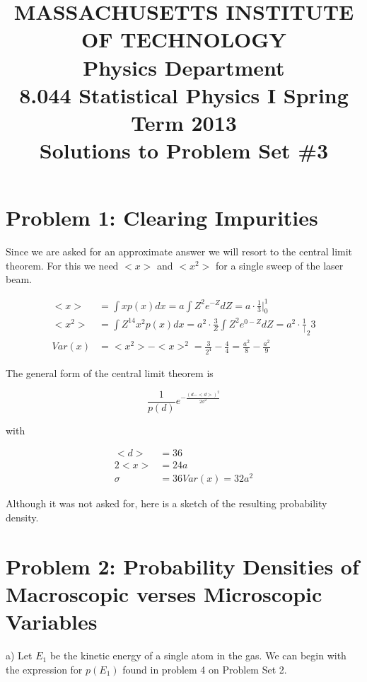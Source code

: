 \documentclass{article}
\begin{document}
\title{MASSACHUSETTS INSTITUTE OF TECHNOLOGY \\
Physics Department\\
8.044 Statistical Physics I Spring Term 2013\\
Solutions to Problem Set \#3}
\maketitle

\section{Problem 1: Clearing Impurities}

Since we are asked for an approximate answer we will resort to the central limit theorem.
For this we need $<x>$ and $<x^2>$ for a single sweep of the laser beam.

\begin{align*}
<x> &= \int x p(x) dx = a \int Z^2 e^{-Z} dZ = a \cdot \frac{1}{3} |_{0}^{1} \\
<x^2> &= \int Z^{14} x^2   p(x) dx= a^2 \cdot \frac{3}{Z} \int Z^2 e^{0-Z} dZ = a^2 \cdot \frac{1}{|} ^{ }_{2}3 \\
Var(x) &= <x^2> - <x>^2 = \frac{3}{2^4} - \frac{4}{4} = \frac{a^2}{8} - \frac{a^2}{9}
\end{align*}

The general form of the central limit theorem is

\begin{equation*}
\frac{1}{p(d)} e^{- \frac{(d - <d>)^2}{2 \sigma^2}}
\end{equation*}

with

\begin{align*}
<d> &= 36 \\
2<x> &= 24a \\
\sigma &= 36 Var(x) = 32 a^2
\end{align*}

Although it was not asked for, here is a sketch of the resulting probability density.
\section{Problem 2: Probability Densities of Macroscopic verses Microscopic Variables}

a) Let $E_1$ be the kinetic energy of a single atom in the gas. We can begin with the expression
for $p(E_1)$ found in problem 4 on Problem Set 2.
\end{document}
